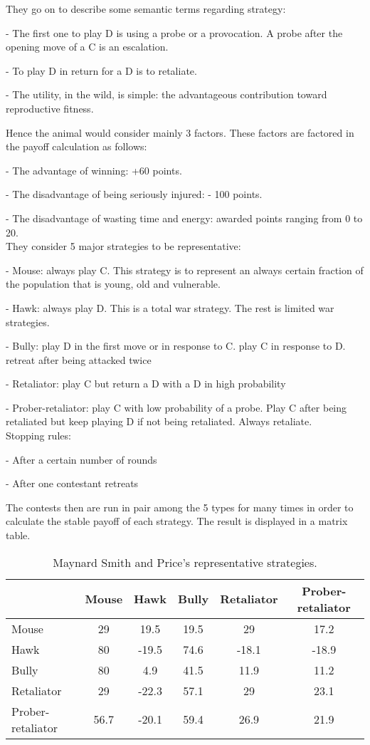 \documentclass[12.5pt]{report}
\begin{document}
They go on to describe some semantic terms regarding strategy:

- The first one to play D is using a probe or a provocation. A probe after the opening move of a C is an escalation.

- To play D in return for a D is to retaliate.

- The utility, in the wild, is simple: the advantageous contribution toward reproductive fitness. 

Hence the animal would consider mainly 3 factors. These factors are factored in the payoff calculation as follows:

- The advantage of winning: +60 points.

- The disadvantage of being seriously injured: - 100 points.

- The disadvantage of wasting time and energy: awarded points ranging from 0 to 20.\\

They consider 5 major strategies to be representative:

- Mouse: always play C. This strategy is to represent an always certain fraction of the population that is young, old and vulnerable.

- Hawk:  always play D. This is a total war strategy. The rest is limited war strategies.

- Bully: play D in the first move or in response to C. play C in response to D. retreat after being attacked twice

- Retaliator: play C but return a D with a D in high probability 

- Prober-retaliator: play C with low probability of a probe. Play C after being retaliated but keep playing D if not being retaliated. Always retaliate.\\

Stopping rules:

- After a certain number of rounds

- After one contestant retreats

The contests then are run in pair among the 5 types for many times in order to calculate the stable payoff of each strategy. The result is displayed in a matrix table. 

\begin{table}
\center
\begin{tabular}{l|ccccc}
\textbf{}& Mouse & Hawk & Bully & Retaliator & Prober-retaliator \\
\hline

Mouse & 29 & 19.5 & 19.5 & 29 & 17.2 \\
Hawk & 80 & -19.5 & 74.6 & -18.1 & -18.9 \\
Bully & 80 &  4.9 & 41.5 & 11.9 & 11.2 \\
Retaliator & 29 & -22.3 & 57.1 & 29 & 23.1 \\
Prober-retaliator & 56.7 & -20.1 & 59.4 & 26.9 & 21.9 \\
\end{tabular}
\caption{Maynard Smith and Price's representative strategies.}
\end{table}
\end{document}
